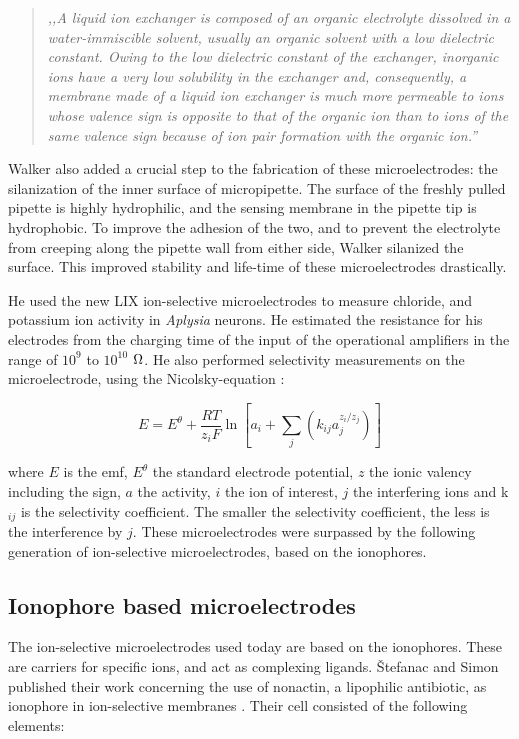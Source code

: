 \begin{quote}
\vspace{0.5cm}
\emph{,,A liquid ion exchanger is composed of an organic electrolyte dissolved in a water-immiscible solvent, usually an organic solvent with a low dielectric constant.
Owing to the low dielectric constant of the exchanger, inorganic ions have a very low solubility in the exchanger and, consequently, a membrane made of a liquid ion exchanger is much more permeable to ions whose valence sign is opposite to that of the organic ion than to ions of the same valence sign because of ion pair formation with the organic ion.''}
\vspace{0.5cm}
\end{quote} 

Walker also added a crucial step to the fabrication of these microelectrodes: the silanization of the inner surface of micropipette.
The surface of the freshly pulled pipette is highly hydrophilic, and the sensing membrane in the pipette tip is hydrophobic.
To improve the adhesion of the two, and to prevent the electrolyte from creeping along the pipette wall from either side, Walker silanized the surface.
This improved stability and life-time of these microelectrodes drastically.

He used the new LIX ion-selective microelectrodes to measure chloride, and potassium ion activity in \emph{Aplysia} neurons.
He estimated the resistance for his electrodes from the charging time of the input of the operational amplifiers in the range of $10^9$ to $10^{10}$ $\ohm$.
He also performed selectivity measurements on the microelectrode, using the Nicolsky-equation \cite{nicolsky1937theory}:

\begin{equation}
E=E^\theta + \frac{RT}{z_iF} \ln \left [ a_i + \sum_{j} \left ( k_{ij}a_j^{z_i/z_j} \right ) \right ]
\end{equation}

where $E$ is the emf, $E^\theta$ the standard electrode potential, $z$ the ionic valency including the sign, $a$ the activity, $i$ the ion of interest, $j$ the interfering ions and k$_{ij}$ is the selectivity coefficient.
The smaller the selectivity coefficient, the less is the interference by $j$.
These microelectrodes were surpassed by the following generation of ion-selective microelectrodes, based on the ionophores.

\subsection{Ionophore based microelectrodes}
The ion-selective microelectrodes used today are based on the ionophores.
These are carriers for specific ions, and act as complexing ligands.
\v{S}tefanac and Simon published their work concerning the use of nonactin, a lipophilic antibiotic, as ionophore in ion-selective membranes \cite{stefanac1966highly, vstefanac1967ion}.
Their cell consisted of the following elements:

